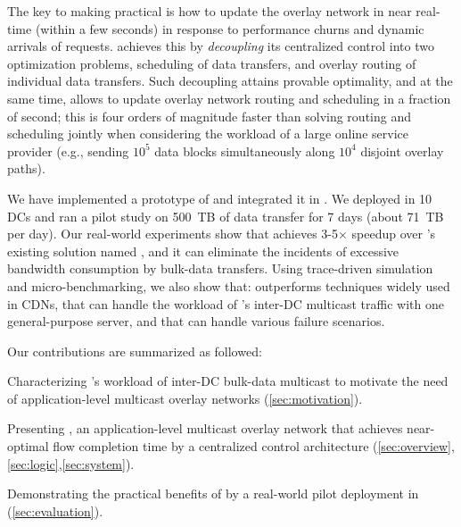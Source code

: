 The key to making \name practical is how to update the overlay
network in near real-time (within a few seconds) in response to
performance churns and dynamic arrivals of requests. \name achieves
this by {\em decoupling} its centralized control into two
optimization problems, scheduling of data transfers, and overlay
routing of individual data transfers. Such decoupling attains
provable optimality, and at the same time, allows \name to update
overlay network routing and scheduling in a fraction of second; this is four
orders of magnitude faster than solving routing and scheduling jointly
when considering the workload of a large online service provider (e.g., sending
$10^5$ data blocks simultaneously along $10^4$ disjoint
overlay paths).


We have implemented a prototype of \name and integrated it in
\company. We deployed
\name in 10 DCs and ran a pilot study on 500~TB of data transfer
for 7 days (about 71~TB per day).
Our real-world experiments show that \name achieves 3-5$\times$
speedup over \company's existing solution named \alg, and it can eliminate the
incidents of excessive bandwidth consumption by bulk-data transfers.
Using trace-driven simulation and micro-benchmarking, we also show
that: \name outperforms techniques widely used in CDNs, that \name
can handle the workload of \company's inter-DC multicast traffic with
one general-purpose server, and that \name can handle various
failure scenarios.


Our contributions are summarized as followed:
\begin{packeditemize}
\item Characterizing \company's workload of inter-DC bulk-data
multicast to motivate the need of application-level multicast
overlay networks (\Section\ref{sec:motivation}).
\item Presenting \name, an application-level multicast overlay
network that achieves near-optimal flow completion time by a
centralized control architecture
(\Section\ref{sec:overview},\ref{sec:logic},\ref{sec:system}).
\item Demonstrating the practical benefits of \name by a real-world
pilot deployment in \company (\Section\ref{sec:evaluation}).
\end{packeditemize}
